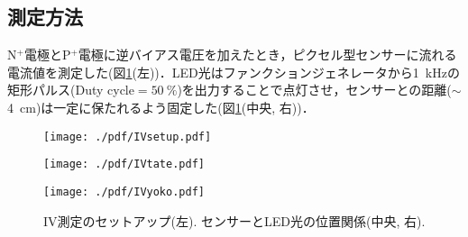 \subsection{測定方法}
\label{sub:IVsetup}
N$^{+}$電極とP$^{+}$電極に逆バイアス電圧を加えたとき，ピクセル型センサーに流れる電流値を測定した(図\ref{fig:IV}(左))．LED光はファンクションジェネレータから1~kHzの矩形パルス(Duty cycle$=50~\%$)を出力することで点灯させ，センサーとの距離($\sim$4~cm)は一定に保たれるよう固定した(図\ref{fig:IV}(中央, 右))．
\begin{figure}[H]
\begin{minipage}{0.36\hsize}
	\texttt{[image: ./pdf/IVsetup.pdf]}
\end{minipage}
\begin{minipage}{0.3\hsize}
	\raggedleft
	\texttt{[image: ./pdf/IVtate.pdf]}
\end{minipage}
\begin{minipage}{0.3\hsize}
	\raggedright
	\texttt{[image: ./pdf/IVyoko.pdf]}
\end{minipage}
	\caption{IV測定のセットアップ(左). センサーとLED光の位置関係(中央, 右).}
	\label{fig:IV}
\end{figure}
